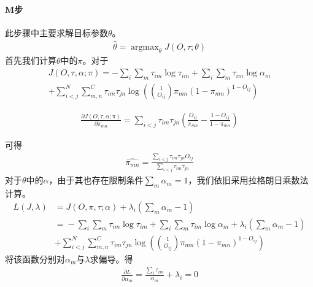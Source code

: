 \paragraph*{M步}此步骤中主要求解目标参数$\theta$。
\begin{equation}\begin{aligned}
\hat{\theta}=\mathop{\arg\max}_\theta J(O,\tau;\theta)
\end{aligned}\end{equation}
首先我们计算$\theta$中的$\pi$。对于
\begin{equation}\begin{aligned}
J(O,\tau,\alpha;\pi)=-\sum_i\sum_m\tau_{im} \log \tau_{im} +\sum_i\sum_m \tau_{im} \log \alpha_m\\ +\sum_{i<j}^N\sum_{m,n}^C\tau_{im}\tau_{jn}\log ( \binom{1}{O_{ij}}\pi_{mn}(1-\pi_{mn})^{1-O_{ij}})
\end{aligned}\end{equation}

\begin{equation}\begin{aligned}
\frac{\partial J(O,\tau,\alpha;\pi)}{\partial \pi_{mn}}=\sum_{i<j}\tau_{im}\tau_{jn}(\frac{O_{ij}}{\pi_{mn}}-\frac{1-O_{ij}}{1-\pi_{mn}})
\end{aligned}\end{equation}

可得
\begin{equation}\begin{aligned}
\hat{\pi_{mn}}=\frac{\sum_{i<j}\tau_{im}\tau_{jn}O_{ij}}{\sum_{i<j}\tau_{im}\tau_{jn}}
\end{aligned}\end{equation}
对于$\theta$中的$\alpha$，由于其也存在限制条件$\sum_m \alpha_m=1$，我们依旧采用拉格朗日乘数法计算。
\begin{equation}\begin{aligned}
L(J,\lambda)&={}J(O,\pi,\tau;\alpha)+\lambda_i(\sum_m \alpha_{m}-1)\\
&={}-\sum_i\sum_m\tau_{im} \log \tau_{im} +\sum_i\sum_m \tau_{im} \log \alpha_m+\lambda_i(\sum_m \alpha_{m}-1)\\ &+\sum_{i<j}^N\sum_{m,n}^C\tau_{im}\tau_{jn}\log ( \binom{1}{O_{ij}}\pi_{mn}(1-\pi_{mn})^{1-O_{ij}})
\end{aligned}\end{equation}
将该函数分别对$\alpha_{m}$与$\lambda$求偏导。得
\begin{equation}\begin{aligned}
\frac{\partial L}{\partial \alpha_m}=\frac{\sum_i\tau_{im}}{\alpha_m}+\lambda_i=0
\end{aligned}\end{equation}

